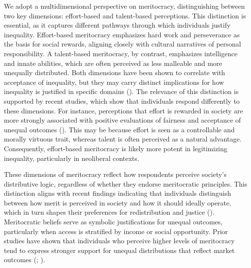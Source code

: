 \documentclass[
  12pt,
]{article}
\begin{document}
We adopt a multidimensional perspective on meritocracy, distinguishing
between two key dimensions: effort-based and talent-based perceptions.
This distinction is essential, as it captures different pathways through
which individuals justify inequality. Effort-based meritocracy
emphasizes hard work and perseverance as the basis for social rewards,
aligning closely with cultural narratives of personal responsibility. A
talent-based meritocracy, by contrast, emphasizes intelligence and
innate abilities, which are often perceived as less malleable and more
unequally distributed. Both dimensions have been shown to correlate with
acceptance of inequality, but they may carry distinct implications for
how inequality is justified in specific domains
().
The relevance of this distinction is supported by recent studies, which
show that individuals respond differently to these dimensions. For
instance, perceptions that effort is rewarded in society are more
strongly associated with positive evaluations of fairness and acceptance
of unequal outcomes (). This may be because effort is seen as a controllable and morally
virtuous trait, whereas talent is often perceived as a natural
advantage. Consequently, effort-based meritocracy is likely more potent
in legitimizing inequality, particularly in neoliberal contexts.

These dimensions of meritocracy reflect how respondents perceive
society's distributive logic, regardless of whether they endorse
meritocratic principles. This distinction aligns with recent findings
indicating that individuals distinguish between how merit is perceived
in society and how it should ideally operate, which in turn shapes their
preferences for redistribution and justice
(). Meritocratic beliefs serve as symbolic justifications for
unequal outcomes, particularly when access is stratified by income or
social opportunity. Prior studies have shown that individuals who
perceive higher levels of meritocracy tend to express stronger support
for unequal distributions that reflect market outcomes
(;
).
\end{document}
